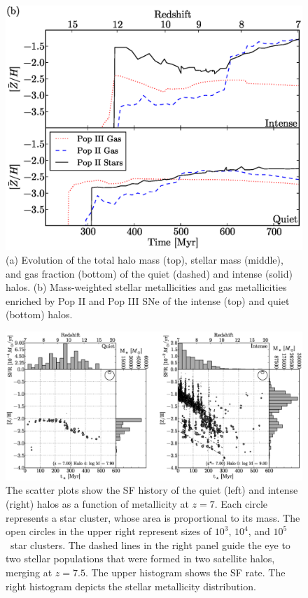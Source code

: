 \documentclass[12pt]{article}
\newcommand{\Ms}{\ifmmode{M_\odot}\else{$M_\odot$}\fi}
\begin{document}
\clearpage
\begin{figure}
\includegraphics[width=\textwidth]{f2.eps}
\caption{\label{fig:evo} (a) Evolution of the total halo mass (top),
  stellar mass (middle), and gas fraction (bottom) of the quiet
  (dashed) and intense (solid) halos.  (b) Mass-weighted stellar
  metallicities and gas metallicities enriched by Pop II and Pop III
  SNe of the intense (top) and quiet (bottom) halos.}
\end{figure}

\clearpage
\begin{figure}
\includegraphics[width=\textwidth]{f3.eps}
\caption{\label{fig:pops} The scatter plots show the SF history of the
  quiet (left) and intense (right) halos as a function of metallicity
  at $z=7$.  Each circle represents a star cluster, whose area is
  proportional to its mass.  The open circles in the upper right
  represent sizes of $10^3$, $10^4$, and $10^5$ \Ms~star clusters.
  The dashed lines in the right panel guide the eye to two stellar
  populations that were formed in two satellite halos, merging at
  $z=7.5$.  The upper histogram shows the SF rate.  The right
  histogram depicts the stellar metallicity distribution.}
\end{figure}
\end{document}
